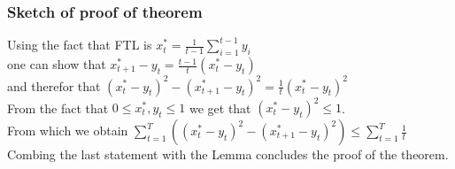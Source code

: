 \documentclass{beamer}
\begin{document}
\begin{frame}
\frametitle{Sketch of proof of theorem}
Using the fact that FTL is $x^*_t = \frac{1}{t-1} \sum_{i=1}^{t-1} y_i$ \\
one can show that $x_{t+1}^*-y_t = \frac{t-1}{t} (x_t^* - y_t)$\\
and therefor that $(x_t^*-y_t)^2 - (x_{t+1}^*-y_t)^2 = \frac{1}{t} (x_t^* - y_t)^2$\\
From the fact that $0\leq x_t^*,y_t \leq 1$ we get that $(x_t^*-y_t)^2\leq 1$.\\
From which we obtain $\sum_{t=1}^T ((x_t^* - y_t)^2-(x_{t+1}^* - y_t)^2) \leq
\sum_{t=1}^{T} \frac{1}{t}$\\
Combing the last statement with the Lemma concludes the proof of the theorem.

\end{frame}
\end{document}
